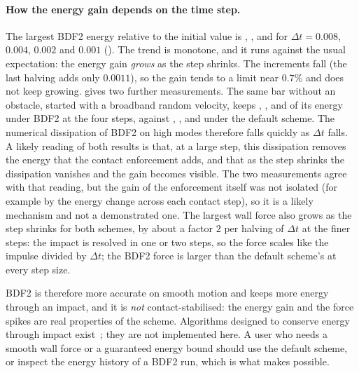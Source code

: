 \paragraph{How the energy gain depends on the time step.}
The largest BDF2 energy relative to the initial value is \ctcImpBdfMaxVcoarse, \ctcImpBdfMaxCoarse, \ctcImpBdfMaxFine and \ctcImpBdfMaxVfine for $\Delta t=0.008$, $0.004$, $0.002$ and $0.001$ (). The trend is monotone, and it runs against the usual expectation: the energy gain \emph{grows} as the step shrinks. The increments fall (the last halving adds only $0.0011$), so the gain tends to a limit near $0.7\%$ and does not keep growing.  gives two further measurements. The same bar without an obstacle, started with a broadband random velocity, keeps \ctcFreeBdfVcoarse, \ctcFreeBdfCoarse, \ctcFreeBdfFine and \ctcFreeBdfVfine of its energy under BDF2 at the four steps, against \ctcFreeTwoVcoarse, \ctcFreeTwoCoarse, \ctcFreeTwoFine and \ctcFreeTwoVfine under the default scheme. The numerical dissipation of BDF2 on high modes therefore falls quickly as $\Delta t$ falls. A likely reading of both results is that, at a large step, this dissipation removes the energy that the contact enforcement adds, and that as the step shrinks the dissipation vanishes and the gain becomes visible. The two measurements agree with that reading, but the gain of the enforcement itself was not isolated (for example by the energy change across each contact step), so it is a likely mechanism and not a demonstrated one. The largest wall force also grows as the step shrinks for both schemes, by about a factor $2$ per halving of $\Delta t$ at the finer steps: the impact is resolved in one or two steps, so the force scales like the impulse divided by $\Delta t$; the BDF2 force is larger than the default scheme's at every step size.

\begin{table}[ht]
\centering\small

\caption{Largest wall force of the bar impact, and energy kept by a bar without obstacle (broadband initial velocity, $t=1.5$), for both schemes.}\label{tab:ct-impact-force}
\end{table}

BDF2 is therefore more accurate on smooth motion and keeps more energy through an impact, and it is \emph{not} contact-stabilised: the energy gain and the force spikes are real properties of the scheme. Algorithms designed to conserve energy through impact exist~\cite{laursen1997energy}; they are not implemented here. A user who needs a smooth wall force or a guaranteed energy bound should use the default scheme, or inspect the energy history of a BDF2 run, which is what  makes possible.

